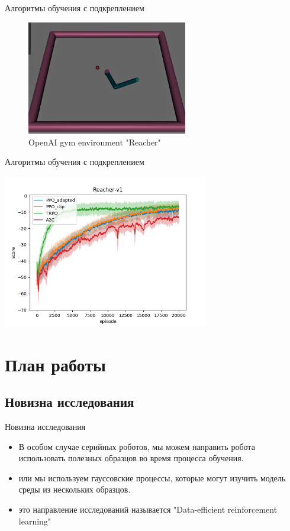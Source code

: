 \documentclass{beamer}
\begin{document}
\begin{frame}{Алгоритмы обучения с подкреплением}
\begin{figure}
    \centering
    \includegraphics[width=7cm]{img/Reacher(Mujoco).png}
    \captionsetup{labelformat=empty}
    \caption{OpenAI gym environment "Reacher"}
\end{figure}

\end{frame}

\begin{frame}{Алгоритмы обучения с подкреплением}
\begin{center}
    \includegraphics[width=9cm]{img/Reacher.png}
\end{center}
\end{frame}

\section{План работы}
\subsection{Новизна исследования}
\begin{frame}{Новизна исследования}
    \begin{itemize}
        \item В особом случае серийных роботов, мы можем направить робота использовать полезных образцов во время  процесса обучения.
        \item или мы используем гауссовские процессы, которые могут изучить модель среды из нескольких образцов.
        \item это направление исследований называется "Data-efficient reinforcement learning"
    \end{itemize}
\end{frame}
\end{document}
